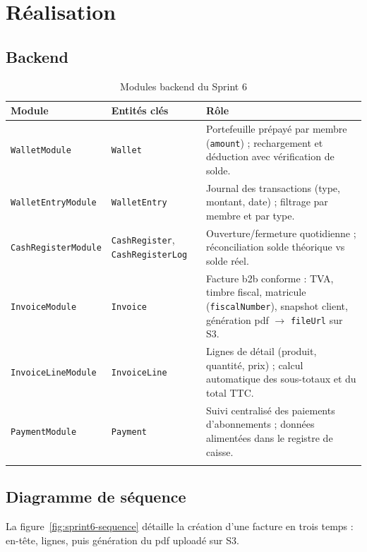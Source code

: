 ﻿\documentclass[../main.tex]{subfiles}
\begin{document}
\section{R\'{e}alisation}

\subsection{Backend}

\begin{longtable}{|>{\footnotesize}p{4.5cm}|>{\footnotesize}p{3.6cm}|p{5.6cm}|}
\hline
\textbf{Module} & \textbf{Entit\'{e}s cl\'{e}s} & \textbf{R\^{o}le} \\
\hline
\endfirsthead
\hline
\endfoot
\texttt{WalletModule} & \texttt{Wallet} & Portefeuille pr\'{e}pay\'{e} par membre (\texttt{amount}) ; rechargement et d\'{e}duction avec v\'{e}rification de solde. \\
\hline
\texttt{WalletEntryModule} & \texttt{WalletEntry} & Journal des transactions (type, montant, date) ; filtrage par membre et par type. \\
\hline
\texttt{CashRegisterModule} & \texttt{CashRegister}, \texttt{CashRegisterLog} & Ouverture/fermeture quotidienne ; r\'{e}conciliation solde th\'{e}orique vs solde r\'{e}el. \\
\hline
\texttt{InvoiceModule} & \texttt{Invoice} & Facture \acrshort{b2b} conforme : TVA, timbre fiscal, matricule (\texttt{fiscalNumber}), snapshot client, g\'{e}n\'{e}ration \acrshort{pdf} $\rightarrow$ \texttt{fileUrl} sur S3. \\
\hline
\texttt{InvoiceLineModule} & \texttt{InvoiceLine} & Lignes de d\'{e}tail (produit, quantit\'{e}, prix) ; calcul automatique des sous-totaux et du total TTC. \\
\hline
\texttt{PaymentModule} & \texttt{Payment} & Suivi centralis\'{e} des paiements d'abonnements ; donn\'{e}es aliment\'{e}es dans le registre de caisse. \\
\hline
\caption{Modules backend du Sprint 6}
\end{longtable}

\subsection{Diagramme de s\'{e}quence}

La figure~\ref{fig:sprint6-sequence} d\'{e}taille la cr\'{e}ation d'une facture en trois temps : en-t\^{e}te, lignes, puis g\'{e}n\'{e}ration du \acrshort{pdf} upload\'{e} sur S3.
\end{document}

